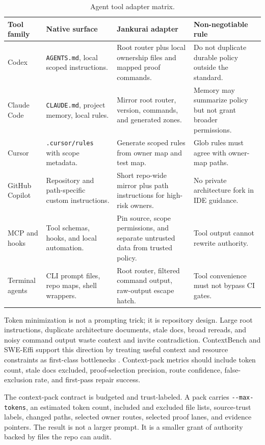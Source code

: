 \begin{table}[t]
\caption{Agent tool adapter matrix.}
\label{tab:tool-adapters}
\centering
\small
\begin{tabularx}{\textwidth}{L{0.16\textwidth} L{0.21\textwidth} Y Y}
\toprule
\textbf{Tool family} & \textbf{Native surface} & \textbf{Jankurai adapter} & \textbf{Non-negotiable rule} \\
\midrule
Codex & \texttt{AGENTS.md}, local scoped instructions. & Root router plus local ownership files and mapped proof commands. & Do not duplicate durable policy outside the standard. \\
Claude Code & \texttt{CLAUDE.md}, project memory, local rules. & Mirror root router, version, commands, and generated zones. & Memory may summarize policy but not grant broader permissions. \\
Cursor & \texttt{.cursor/rules} with scope metadata. & Generate scoped rules from owner map and test map. & Glob rules must agree with owner-map paths. \\
GitHub Copilot & Repository and path-specific custom instructions. & Short repo-wide mirror plus path instructions for high-risk owners. & No private architecture fork in IDE guidance. \\
MCP and hooks & Tool schemas, hooks, and local automation. & Pin source, scope permissions, and separate untrusted data from trusted policy. & Tool output cannot rewrite authority. \\
Terminal agents & CLI prompt files, repo maps, shell wrappers. & Root router, filtered command output, raw-output escape hatch. & Tool convenience must not bypass CI gates. \\
\bottomrule
\end{tabularx}
\end{table}

Token minimization is not a prompting trick; it is repository design. Large root instructions, duplicate architecture documents, stale docs, broad rereads, and noisy command output waste context and invite contradiction. ContextBench and SWE-Effi support this direction by treating useful context and resource constraints as first-class bottlenecks \cite{contextBench2026,sweEffi2025}. Context-pack metrics should include token count, stale docs excluded, proof-selection precision, route confidence, false-exclusion rate, and first-pass repair success.

The context-pack contract is budgeted and trust-labeled. A pack carries \verb|--max-tokens|, an estimated token count, included and excluded file lists, source-trust labels, changed paths, selected owner routes, selected proof lanes, and evidence pointers. The result is not a larger prompt. It is a smaller grant of authority backed by files the repo can audit.
